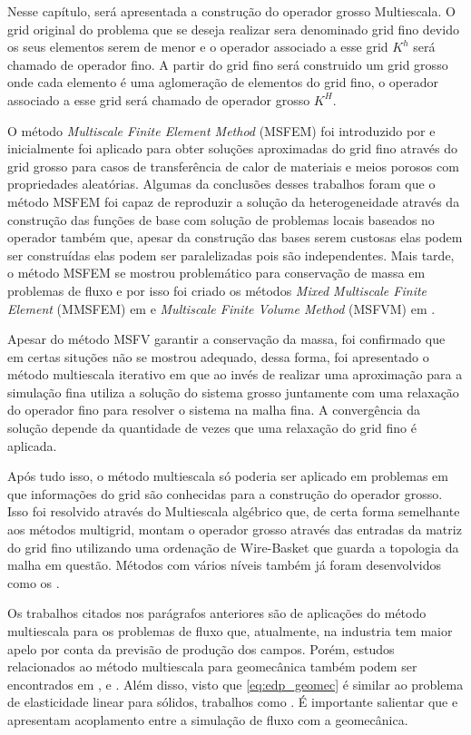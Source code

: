 
Nesse capítulo, será apresentada a construção do operador grosso Multiescala. O grid original do problema que se deseja realizar sera denominado grid fino devido os seus elementos serem de menor e o operador associado a esse grid $K^h$ será chamado de operador fino. A partir do grid fino será construido um grid grosso onde cada elemento é uma aglomeração de elementos do grid fino, o operador associado a esse grid será chamado de operador grosso $K^H$.


O método \textit{Multiscale Finite Element Method} (MSFEM) foi introduzido por \citet{thomashou} e inicialmente foi aplicado para obter soluções aproximadas do grid fino através do grid grosso para casos de transferência de calor de materiais e meios porosos com propriedades aleatórias. Algumas da conclusões desses trabalhos foram que o método MSFEM foi capaz de reproduzir a solução da heterogeneidade através da construção das funções de base com solução de problemas locais baseados no operador também que, apesar da construção das bases serem custosas elas podem ser construídas elas podem ser paralelizadas pois são independentes.  Mais tarde, o método MSFEM se mostrou problemático para conservação de massa em problemas de fluxo e por isso foi criado os métodos \textit{Mixed Multiscale Finite Element} (MMSFEM) em \citet{mixedmsfem} e  \textit{Multiscale Finite Volume Method} (MSFVM) em \citet{msfv}. 

Apesar do método MSFV garantir a conservação da massa, foi confirmado que em certas situções não se mostrou adequado, dessa forma, foi apresentado o método multiescala iterativo em \citet{iterativems} que ao invés de realizar uma aproximação para a simulação fina utiliza a solução do sistema grosso juntamente com uma relaxação do operador fino para resolver o sistema na malha fina. A convergência da solução depende da quantidade de vezes que uma relaxação do grid fino é aplicada. 

Após tudo isso, o método multiescala só poderia ser aplicado em problemas em que informações do grid são conhecidas para a construção do operador grosso. Isso foi resolvido através do Multiescala algébrico que, de certa forma semelhante aos métodos multigrid, montam o operador grosso através das entradas da matriz do grid fino utilizando uma ordenação de Wire-Basket que guarda a topologia da malha em questão. Métodos com vários níveis também já foram desenvolvidos como os \citet{multilevel}.



Os trabalhos citados nos parágrafos anteriores são de aplicações do método multiescala para os problemas de fluxo que, atualmente, na industria tem maior apelo por conta da previsão de produção dos campos. Porém, estudos relacionados ao método multiescala para geomecânica também podem ser encontrados em \citet{casteletto}, \citet{irina} e \citet{castelettoacoplado}. Além disso, visto que \eqref{eq:edp_geomec} é similar ao problema de elasticidade linear para sólidos, trabalhos como \citet{mbuck}. É importante salientar que \cite{casteletto} e \cite{irina} apresentam acoplamento entre a simulação de fluxo com a geomecânica.


